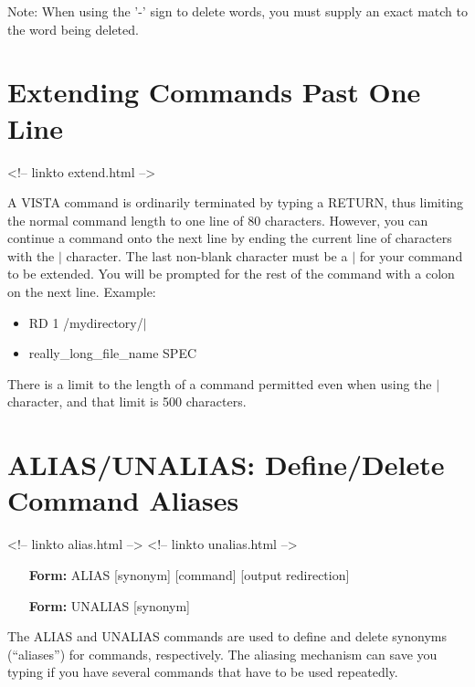 Note: When using the '-' sign to delete words, you must supply an exact
match to the word being deleted.

\section{Extending Commands Past One Line}
\begin{rawhtml}
<!-- linkto extend.html -->
\end{rawhtml}

A VISTA command is ordinarily terminated by typing a RETURN, thus limiting
the normal command length to one line of 80 characters.  However, you can
continue a command onto the next line by ending the current line of
characters with the $|$ character.  The last non-blank character must be a
$|$ for your command to be extended.  You will be prompted for the rest of
the command with a colon on the next line. Example:

\begin{itemize}
  \item{ RD 1 /mydirectory/$|$}
  \item{really\_long\_file\_name SPEC}
\end{itemize}

There is a limit to the length of a command permitted even when using the
$|$ character, and that limit is 500 characters.

\section{ALIAS/UNALIAS: Define/Delete Command Aliases}
\begin{rawhtml}
<!-- linkto alias.html -->
<!-- linkto unalias.html -->
\end{rawhtml}

\begin{itemize}
  \item[\textbf{Form: }ALIAS {[synonym]} {[command]} {[output
       redirection]}\hfill]{} 
  \item[\textbf{Form: }UNALIAS {[synonym]}\hfill]{}
\end{itemize}

The ALIAS and UNALIAS commands are used to define and delete synonyms
(``aliases'') for commands, respectively.  The aliasing mechanism can save
you typing if you have several commands that have to be used repeatedly.

